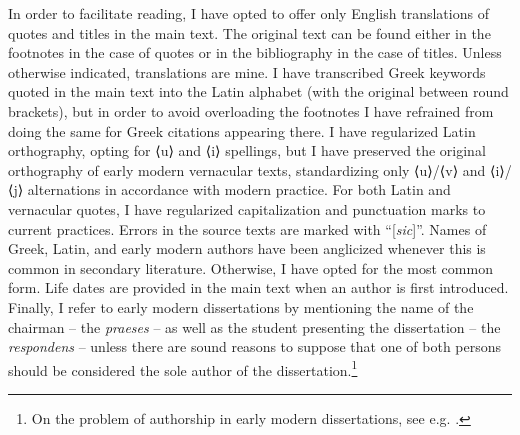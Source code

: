 \hypertarget{Toc19704800}{}
In order to facilitate reading, I have opted to offer only English translations of quotes and titles in the main text. The original text can be found either in the footnotes in the case of quotes or in the bibliography in the case of titles. Unless otherwise indicated, translations are mine. I have transcribed Greek keywords quoted in the main text into the Latin alphabet (with the original between round brackets), but in order to avoid overloading the footnotes I have refrained from doing the same for Greek citations appearing there. I have regularized Latin orthography, opting for ⟨u⟩ and ⟨i⟩ spellings, but I have preserved the original orthography of early modern vernacular texts, standardizing only ⟨u⟩/⟨v⟩ and ⟨i⟩/⟨j⟩ alternations in accordance with modern practice. For both Latin and vernacular quotes, I have regularized capitalization and punctuation marks to current practices. Errors in the source texts are marked with “[\textit{sic}]”. Names of Greek, Latin, and early modern authors have been anglicized whenever this is common in secondary literature. Otherwise, I have opted for the most common form. Life dates are provided in the main text when an author is first introduced. Finally, I refer to early modern dissertations by mentioning the name of the chairman – the \textit{praeses} – as well as the student presenting the dissertation – the \textit{respondens} – unless there are sound reasons to suppose that one of both persons should be considered the sole author of the dissertation.\footnote{On the problem of authorship in early modern dissertations, see e.g. \citet{Considine2008b}.}
